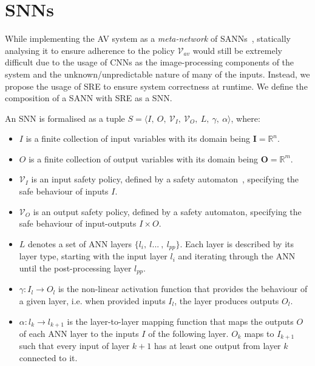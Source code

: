 \section{\acfp{SNN}}
\label{sec:definitions}

While implementing the \ac{AV} system as a \textit{meta-network} of \acp{SANN}~\cite{sann}, statically analysing it to ensure adherence to the policy $\mathcal{V}_{av}$ would still be extremely difficult due to the usage of \acp{CNN} as the image-processing components of the system and the unknown/unpredictable nature of many of the inputs.
Instead, we propose the usage of \ac{SRE} to ensure system correctness at runtime.
We define the composition of a \ac{SANN} with \ac{SRE} as a \ac{SNN}.

\begin{definition}
	\label{def:ssann}
	An \ac{SNN} is formalised as a tuple $S = \langle I,~O,~\mathcal{V}_I,~\mathcal{V}_O,~L,~\gamma,~\alpha  \rangle$, where:
	\begin{itemize}
		\item $I$ is a finite collection of input variables with
		its domain being $\mathbf{I} = \mathbb{R}^n$.
		\item  $O$ is a finite collection of  output variables with
		its domain being $\mathbf{O} = \mathbb{R}^m$.
		\item $\mathcal{V}_I$ is an input safety policy, defined by a safety automaton~\cite{recps}, specifying the safe behaviour of inputs $I$.
		\item $\mathcal{V}_O$ is an output safety policy, defined by a safety automaton, specifying the safe behaviour of input-outputs $I \times O$.
		\item $L$ denotes a set of \ac{ANN} layers $\{l_i,~l...~,~l_{pp}\}$. Each layer is described by its layer type, starting with the input layer $l_i$ and iterating through the \ac{ANN} until the post-processing layer $l_{pp}$.
		\item $\gamma: I_l \rightarrow O_l$ is the non-linear activation function that provides the behaviour of a given layer, i.e. when provided inputs $I_l$, the layer produces outputs $O_l$.
		\item $\alpha: l_k \rightarrow l_{k+1}$ is the layer-to-layer mapping function that maps the outputs $O$ of each \ac{ANN} layer to the inputs  $I$ of the following layer. $O_k$ maps to $I_{k+1}$ such that every input of layer $k+1$ has at least one output from layer $k$ connected to it. 
	\end{itemize}
\end{definition} 


